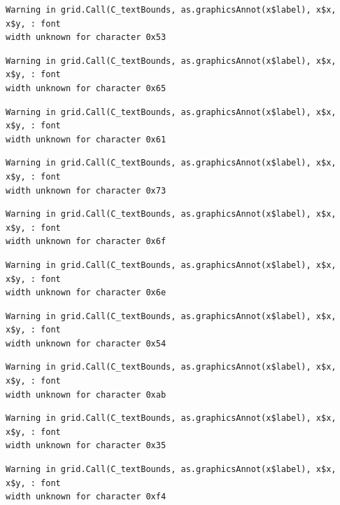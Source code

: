 \documentclass[
  letterpaper,
  DIV=11,
  numbers=noendperiod]{scrreprt}
\begin{document}
\begin{verbatim}
Warning in grid.Call(C_textBounds, as.graphicsAnnot(x$label), x$x, x$y, : font
width unknown for character 0x53
\end{verbatim}

\begin{verbatim}
Warning in grid.Call(C_textBounds, as.graphicsAnnot(x$label), x$x, x$y, : font
width unknown for character 0x65
\end{verbatim}

\begin{verbatim}
Warning in grid.Call(C_textBounds, as.graphicsAnnot(x$label), x$x, x$y, : font
width unknown for character 0x61
\end{verbatim}

\begin{verbatim}
Warning in grid.Call(C_textBounds, as.graphicsAnnot(x$label), x$x, x$y, : font
width unknown for character 0x73
\end{verbatim}

\begin{verbatim}
Warning in grid.Call(C_textBounds, as.graphicsAnnot(x$label), x$x, x$y, : font
width unknown for character 0x6f
\end{verbatim}

\begin{verbatim}
Warning in grid.Call(C_textBounds, as.graphicsAnnot(x$label), x$x, x$y, : font
width unknown for character 0x6e
\end{verbatim}

\begin{verbatim}
Warning in grid.Call(C_textBounds, as.graphicsAnnot(x$label), x$x, x$y, : font
width unknown for character 0x54
\end{verbatim}

\begin{verbatim}
Warning in grid.Call(C_textBounds, as.graphicsAnnot(x$label), x$x, x$y, : font
width unknown for character 0xab
\end{verbatim}

\begin{verbatim}
Warning in grid.Call(C_textBounds, as.graphicsAnnot(x$label), x$x, x$y, : font
width unknown for character 0x35
\end{verbatim}

\begin{verbatim}
Warning in grid.Call(C_textBounds, as.graphicsAnnot(x$label), x$x, x$y, : font
width unknown for character 0xf4
\end{verbatim}
\end{document}

